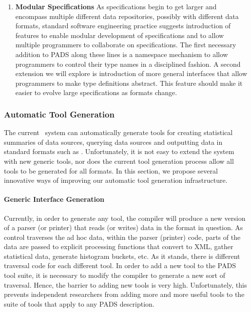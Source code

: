 \documentclass[11pt]{article}
\begin{document}
\begin{enumerate}

\item {\bf Modular Specifications}
As specifications begin to get larger and encompass multiple different data repositories,
possibly with different data formats, standard software engineering practice suggests
introduction of features to enable modular development of specifications and to allow multiple
programmers to collaborate on specifications.  The first necessary addition to PADS along these 
lines is a namespace mechanism to allow programmers to control their type names in a disciplined fashion.
A second extension we will explore is introduction of more general interfaces that allow programmers
to make type definitions abstract.  This feature should make it easier to evolve large specifications as
formats change.

\end{enumerate}

\subsubsection{Automatic Tool Generation}

The current \pads{}\ system can automatically generate tools for
creating statistical summaries of data sources, querying
data sources and outputting data in standard formats such as
\xml.  Unfortunately, it is not easy to extend the system with new generic tools,
nor does the current tool generation process allow all tools to be generated for all formats.
In this section, we propose several innovative ways of improving our
automatic tool generation infrastructure.

\paragraph*{Generic Interface Generation}
Currently, in order to generate any tool, the \pads{} compiler will 
produce a new version of a parser (or printer) that reads (or writes)
data in the format in question.  As control traverses the ad hoc data, within the parser (printer) code,
parts of the data are passed to explicit processing functions that 
convert to XML, gather statistical data, generate histogram buckets, etc.
As it stands, there is different traversal code for each different tool.
In order to add a new tool to the PADS tool suite, it is necessary to modify the compiler
to generate a new sort of traversal.  Hence, the barrier to adding new tools
is very high.  Unfortunately, this prevents independent researchers from adding more and more
useful tools to the suite of tools that apply to any PADS description.
\end{document}

